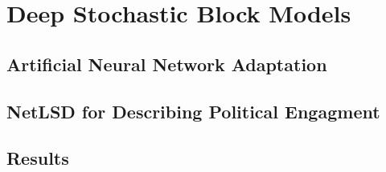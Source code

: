 \section{Deep Stochastic Block Models}\label{sec:DeepSBMs}

\subsection{Artificial Neural Network Adaptation}\label{sec:ANNAdaptation}

\subsection{NetLSD for Describing Political Engagment}\label{sec:NetLSDForSBM}

\subsection{Results}\label{sec:DeepSBMsResults}

